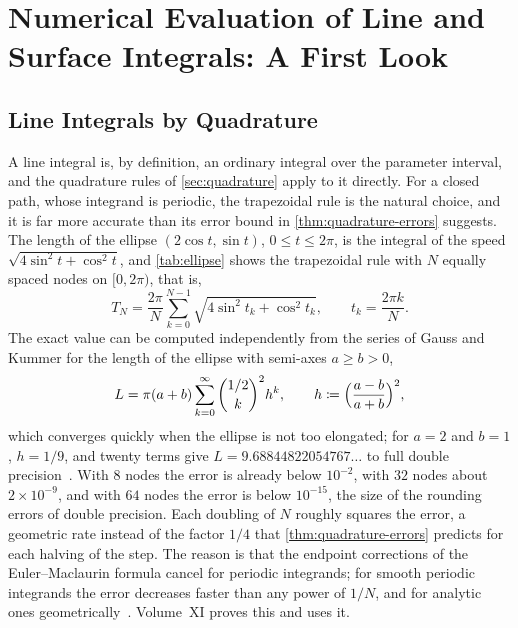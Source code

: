 \section{Numerical Evaluation of Line and Surface Integrals: A First Look}
\label{sec:vector-numerics}

\subsection{Line Integrals by Quadrature}

A line integral is, by definition, an ordinary integral over the parameter interval, and the quadrature rules of \cref{sec:quadrature} apply to it directly. For a closed path, whose integrand is periodic, the trapezoidal rule is the natural choice, and it is far more accurate than its error bound in \cref{thm:quadrature-errors} suggests. The length of the ellipse $(2\cos t,\sin t)$, $0\le t\le2\pi$, is the integral of the speed $\sqrt{4\sin^2t+\cos^2t}$, and \cref{tab:ellipse} shows the trapezoidal rule with $N$ equally spaced nodes on $[0,2\pi)$, that is,
\[
T_N=\frac{2\pi}N\sum_{k=0}^{N-1}\sqrt{4\sin^2t_k+\cos^2t_k},\qquad t_k=\frac{2\pi k}N .
\]
The exact value can be computed independently from the series of Gauss and Kummer for the length of the ellipse with semi-axes $a\ge b>0$,
\begin{equation}
L=\pi(a+b)\sum_{k=0}^\infty\binom{1/2}k^2h^k,\qquad h\coloneqq\Bigl(\frac{a-b}{a+b}\Bigr)^2 ,
\label{eq:gauss-kummer}
\end{equation}
which converges quickly when the ellipse is not too elongated; for $a=2$ and $b=1$, $h=1/9$, and twenty terms give $L=9.68844822054767\ldots$ to full double precision~\cite{almkvist1988}. With $8$ nodes the error is already below $10^{-2}$, with $32$ nodes about $2\times10^{-9}$, and with $64$ nodes the error is below $10^{-15}$, the size of the rounding errors of double precision. Each doubling of $N$ roughly squares the error, a geometric rate instead of the factor $1/4$ that \cref{thm:quadrature-errors} predicts for each halving of the step. The reason is that the endpoint corrections of the Euler--Maclaurin formula cancel for periodic integrands; for smooth periodic integrands the error decreases faster than any power of $1/N$, and for analytic ones geometrically~\cite{trefethen2014}. Volume~XI proves this and uses it.

